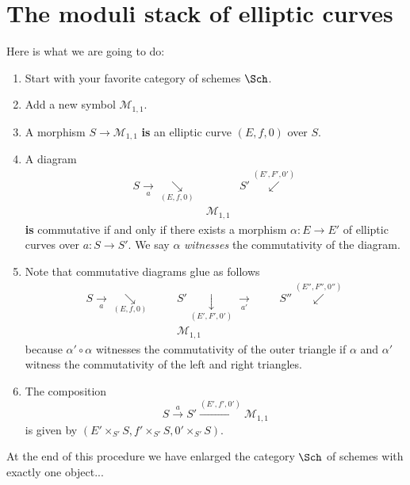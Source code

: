 \section{The moduli stack of elliptic curves}
\label{stacks-introduction-section-moduli-elliptic-curves}
Here is what we are going to do:
\begin{enumerate}
\item Start with your favorite category of schemes $\Sch$.
\item Add a new symbol $\mathcal{M}_{1, 1}$.
\item A morphism $S \to \mathcal{M}_{1, 1}$ {\bf is} an elliptic curve
$(E, f, 0)$ over $S$.
\item A diagram
$$
\begin{array}{ccc}S \underset{a}{\longrightarrow}\underset{(E, f, 0)}{\searrow} &  & S' \overset{(E', F', 0')}{\swarrow} \\  & \mathcal{M}_{1, 1} & \end{array}
$$
{\bf is} commutative if and only if there exists a morphism $\alpha : E \to E'$
of elliptic curves over $a : S \to S'$. We say $\alpha$ {\it witnesses}
the commutativity of the diagram.
\item Note that commutative diagrams glue as follows
$$
\begin{array}{ccccccc}S \underset{a}{\longrightarrow}\underset{(E, f, 0)}{\searrow} &  &  & S' \underset{(E', F', 0')}{\downarrow}\underset{a'}{\longrightarrow} &  &  & S'' \overset{(E'', F'', 0'')}{\swarrow} \\  &  &  & \mathcal{M}_{1, 1} &  &  & \end{array}
$$
because $\alpha' \circ \alpha$ witnesses the commutativity of the outer
triangle if $\alpha$ and $\alpha'$ witness the commutativity of the left
and right triangles.
\item The composition
$$
S \xrightarrow{a} S' \xrightarrow{(E', f', 0')} \mathcal{M}_{1, 1}
$$
is given by $(E' \times_{S'} S, f' \times_{S'} S, 0' \times_{S'} S)$.
\end{enumerate}
At the end of this procedure we have enlarged the category $\Sch$
of schemes with exactly one object...

